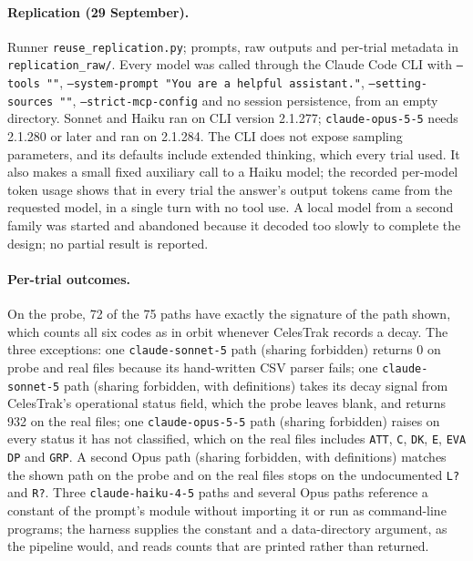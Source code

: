 \paragraph{Replication (29 September).}
Runner \texttt{reuse\_replication.py}; prompts, raw outputs and per-trial
metadata in \texttt{replication\_raw/}. Every model was called through the
Claude Code CLI with \texttt{--tools ""},
\texttt{--system-prompt "You are a helpful assistant."},
\texttt{--setting-sources ""}, \texttt{--strict-mcp-config} and no session
persistence, from an empty directory. Sonnet and Haiku ran on CLI version
2.1.277; \texttt{claude-opus-5-5} needs 2.1.280 or later and ran on 2.1.284. The
CLI does not expose sampling parameters, and its defaults include extended
thinking, which every trial used. It also makes a small fixed auxiliary call to a
Haiku model; the recorded per-model token usage shows that in every trial the
answer's output tokens came from the requested model, in a single turn with no
tool use. A local model from a second family was started and abandoned because
it decoded too slowly to complete the design; no partial result is reported.

\paragraph{Per-trial outcomes.}
On the probe, 72 of the 75 paths have exactly the signature of the path shown,
which counts all six codes as in orbit whenever CelesTrak records a decay. The
three exceptions: one \texttt{claude-sonnet-5} path (sharing forbidden) returns 0
on probe and real files because its hand-written CSV parser fails; one
\texttt{claude-sonnet-5} path (sharing forbidden, with definitions) takes its
decay signal from CelesTrak's operational status field, which the probe leaves
blank, and returns 932 on the real files; one \texttt{claude-opus-5-5} path
(sharing forbidden) raises on every status it has not classified, which on the
real files includes \texttt{ATT}, \texttt{C}, \texttt{DK}, \texttt{E},
\texttt{EVA DP} and \texttt{GRP}. A second Opus path (sharing forbidden, with
definitions) matches the shown path on the probe and on the real files stops on
the undocumented \texttt{L?} and \texttt{R?}. Three \texttt{claude-haiku-4-5}
paths and several Opus paths reference a constant of the prompt's module without
importing it or run as command-line programs; the harness supplies the constant
and a data-directory argument, as the pipeline would, and reads counts that are
printed rather than returned.

